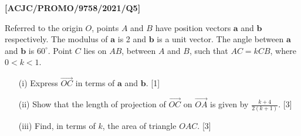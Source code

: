 \item \textbf{{[}ACJC/PROMO/9758/2021/Q5{]}}

Referred to the origin $O$, points $A$ and $B$ have position vectors
$\mathbf{a}$ and $\mathbf{b}$ respectively. The modulus of $\mathbf{a}$
is 2 and $\mathbf{b}$ is a unit vector. The angle between $\mathbf{a}$
and $\mathbf{b}$ is $60^{\circ}$. Point $C$ lies on $AB$, between
$A$ and $B$, such that $AC=kCB$, where $0<k<1$. 
\begin{enumerate}
\item[(i)]  Express $\overrightarrow{OC}$ in terms of $\mathbf{a}$ and $\mathbf{b}$.
\hfill{}{[}1{]}
\item[(ii)]  Show that the length of projection of $\overrightarrow{OC}$ on
$\overrightarrow{OA}$ is given by $\frac{k+4}{2\left(k+1\right)}$.\hfill{}
{[}3{]}
\item[(iii)]  Find, in terms of $k$, the area of triangle $OAC$.\hfill{} {[}3{]}
\end{enumerate}